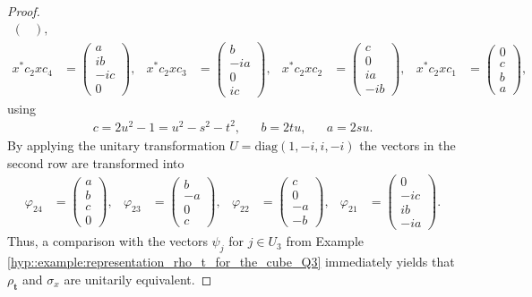 \documentclass[a4paper]{amsart}
\begin{document}
\begin{proof}
\begin{align*}
\begin{pmatrix}
        \end{pmatrix},  \\
%
        x^\ast c_2 x c_4 &= \begin{pmatrix}
            a \\ ib \\ -ic \\ 0
        \end{pmatrix}, &
        x^\ast c_2 x c_3 &= \begin{pmatrix}
            b \\ -ia \\ 0 \\ ic
        \end{pmatrix},&
        x^\ast c_2 x c_2 &= \begin{pmatrix}
            c \\ 0 \\ ia \\ -ib
        \end{pmatrix}, &
        x^\ast c_2 x c_1 &= \begin{pmatrix}
            0 \\ c \\ b \\ a
        \end{pmatrix},
    \end{align*}
    using
    \begin{align*}
        c = 2u^2 - 1 = u^2 - s^2 - t^2,
        & & b = 2tu, 
        & & a = 2su.
    \end{align*}
    By applying the unitary transformation $U = \mathrm{diag}(1, -i, i, -i)$ the vectors in the second row are transformed into
    \begin{align*}
        \varphi_{24} &= \begin{pmatrix}
            a \\ b \\ c \\ 0
        \end{pmatrix}, &
        \varphi_{23} &= \begin{pmatrix}
            b \\ -a \\ 0 \\ c
        \end{pmatrix}, &
        \varphi_{22} &= \begin{pmatrix}
            c \\ 0 \\ -a \\ -b
        \end{pmatrix}, &
        \varphi_{21} &= \begin{pmatrix}
            0 \\ -ic \\ ib \\ -ia
        \end{pmatrix}.
    \end{align*}
    Thus, a comparison with the vectors $\psi_j$ for $j \in U_3$ from Example \ref{hyp::example:representation_rho_t_for_the_cube_Q3} immediately yields that $\rho_{\mathbf{t}}$ and $\sigma_x$ are unitarily equivalent.
\end{proof}
\end{document}
